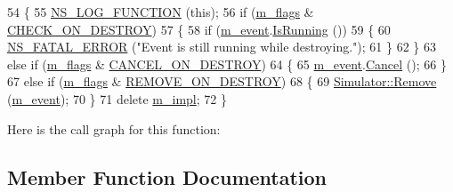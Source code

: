 \begin{DoxyCode}
54 \{
55   \hyperlink{log-macros-disabled_8h_a90b90d5bad1f39cb1b64923ea94c0761}{NS\_LOG\_FUNCTION} (\textcolor{keyword}{this});
56   \textcolor{keywordflow}{if} (\hyperlink{classns3_1_1Timer_a807d2dc469a7a90e18ab39f50edd420f}{m\_flags} & \hyperlink{classns3_1_1Timer_a816309b83cd2a35bea47d9bbc6bbf721a14b70e990e7118eab850607d3d1640dc}{CHECK\_ON\_DESTROY})
57     \{
58       \textcolor{keywordflow}{if} (\hyperlink{classns3_1_1Timer_a53f4b3ad509801685a817d49f0e002fe}{m\_event}.\hyperlink{classns3_1_1EventId_aabf8476d1a080c199ea0c6aa9ccea372}{IsRunning} ())
59         \{
60           \hyperlink{group__fatal_ga5131d5e3f75d7d4cbfd706ac456fdc85}{NS\_FATAL\_ERROR} (\textcolor{stringliteral}{"Event is still running while destroying."});
61         \}
62     \}
63   \textcolor{keywordflow}{else} \textcolor{keywordflow}{if} (\hyperlink{classns3_1_1Timer_a807d2dc469a7a90e18ab39f50edd420f}{m\_flags} & \hyperlink{classns3_1_1Timer_a816309b83cd2a35bea47d9bbc6bbf721a07a9dd5063b32fb6cf1f813c6ee7e28e}{CANCEL\_ON\_DESTROY})
64     \{
65       \hyperlink{classns3_1_1Timer_a53f4b3ad509801685a817d49f0e002fe}{m\_event}.\hyperlink{classns3_1_1EventId_a993ae94e48e014e1afd47edb16db7a11}{Cancel} ();
66     \}
67   \textcolor{keywordflow}{else} \textcolor{keywordflow}{if} (\hyperlink{classns3_1_1Timer_a807d2dc469a7a90e18ab39f50edd420f}{m\_flags} & \hyperlink{classns3_1_1Timer_a816309b83cd2a35bea47d9bbc6bbf721a2e7169520dfa83c15219cb701832ad43}{REMOVE\_ON\_DESTROY})
68     \{
69       \hyperlink{classns3_1_1Simulator_ae30cacdda6cd0d5d62a8f2097b320506}{Simulator::Remove} (\hyperlink{classns3_1_1Timer_a53f4b3ad509801685a817d49f0e002fe}{m\_event});
70     \}
71   \textcolor{keyword}{delete} \hyperlink{classns3_1_1Timer_a2a82602577e5145f094205e076850e64}{m\_impl};
72 \}
\end{DoxyCode}


Here is the call graph for this function\+:




\subsection{Member Function Documentation}
